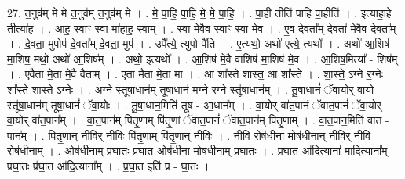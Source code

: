 \documentclass[17pt]{extarticle}
\begin{document}
27. त॒नुव॑म् मे मे त॒नुव॑म् त॒नुव॑म् मे । . मे॒ पा॒हि॒ पा॒हि॒ मे॒ मे॒ पा॒हि॒ । . पा॒ही तीति॑ पाहि पा॒हीति॑ । . इत्या॑हा॒हे तीत्या॑ह । . आ॒ह॒ स्वाꣳ स्वा मा॑हाह॒ स्वाम् । . स्वा मे॒वैव स्वाꣳ स्वा मे॒व । . ए॒व दे॒वता᳚म् दे॒वता॑ मे॒वैव दे॒वता᳚म् । . दे॒वता॒ मुपोप॑ दे॒वता᳚म् दे॒वता॒ मुप॑ । . उपै᳚त्ये॒ त्युपो पै॑ति । . ए॒त्यथो॒ अथो॑ एत्ये॒ त्यथो᳚ । . अथो॑ आ॒शिष॑ मा॒शिष॒ मथो॒ अथो॑ आ॒शिष᳚म् । . अथो॒ इत्यथो᳚ । . आ॒शिष॑ मे॒वै वाशिष॑ मा॒शिष॑ मे॒व । . आ॒शिष॒मित्या᳚ - शिष᳚म् । . ए॒वैता मे॒ता मे॒वै वैताम् । . ए॒ता मैता मे॒ता मा । . आ शा᳚स्ते शास्त॒ आ शा᳚स्ते । . शा॒स्ते॒ ऽग्ने र॒ग्नेः शा᳚स्ते शास्ते॒ ऽग्नेः । . अ॒ग्ने स्तू॑षा॒धान॑म् तूषा॒धान॑ म॒ग्ने र॒ग्ने स्तू॑षा॒धान᳚म् । . तू॒षा॒धानं॑ ॅवा॒योर् वा॒यो स्तू॑षा॒धान॑म् तूषा॒धानं॑ ॅवा॒योः । . तू॒षा॒धान॒मिति॑ तूष - आ॒धान᳚म् । . वा॒योर् वा॑त॒पानं॑ ॅवात॒पानं॑ ॅवा॒योर् वा॒योर् वा॑त॒पान᳚म् । . वा॒त॒पान॑म् पितृ॒णाम् पि॑तृ॒णां ॅवा॑त॒पानं॑ ॅवात॒पान॑म् पितृ॒णाम् । . वा॒त॒पान॒मिति॑ वात - पान᳚म् । . पि॒तृ॒णान् नी॒विर् नी॒विः पि॑तृ॒णाम् पि॑तृ॒णान् नी॒विः । . नी॒वि रोष॑धीना॒ मोष॑धीनान् नी॒विर् नी॒वि रोष॑धीनाम् । . ओष॑धीनाम् प्रघा॒तः प्र॑घा॒त ओष॑धीना॒ मोष॑धीनाम् प्रघा॒तः । . प्र॒घा॒त आ॑दि॒त्याना॑ मादि॒त्याना᳚म् प्रघा॒तः प्र॑घा॒त आ॑दि॒त्याना᳚म् । . प्र॒घा॒त इति॑ प्र - घा॒तः । \newline
\end{document}
